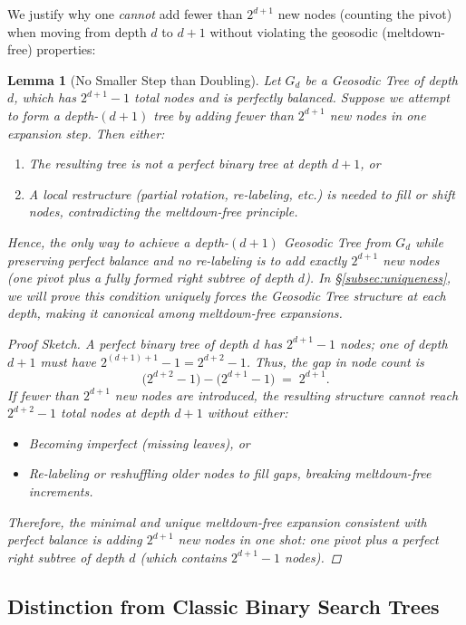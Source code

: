 \documentclass[11pt]{article}
\newtheorem{lemma}[theorem]{Lemma}
\theoremstyle{definition}
\theoremstyle{remark}
\begin{document}
We justify why one \emph{cannot} add fewer than $2^{d+1}$ new nodes (counting the pivot) 
when moving from depth $d$ to $d+1$ without violating the geosodic (meltdown-free) properties:

\begin{lemma}[No Smaller Step than Doubling]
\label{lem:no-smaller-step}
Let $G_d$ be a Geosodic Tree of depth $d$, which has $2^{d+1}-1$ total nodes 
and is perfectly balanced. Suppose we attempt to form a depth-$(d+1)$ tree by adding 
fewer than $2^{d+1}$ new nodes in one expansion step. Then either:
\begin{enumerate}
  \item The resulting tree is \emph{not} a perfect binary tree at depth $d+1$, or
  \item A local restructure (partial rotation, re-labeling, etc.) is needed to fill 
        or shift nodes, contradicting the meltdown-free principle.
\end{enumerate}
Hence, the only way to achieve a depth-$(d+1)$ Geosodic Tree from $G_d$ while preserving 
perfect balance and no re-labeling is to add exactly $2^{d+1}$ new nodes (one pivot plus a 
fully formed right subtree of depth $d$). In \S\ref{subsec:uniqueness},
we will prove this condition uniquely forces the Geosodic Tree structure
at each depth, making it \emph{canonical} among meltdown-free expansions.

\begin{proof}[Proof Sketch]
A perfect binary tree of depth $d$ has $2^{d+1}-1$ nodes; 
one of depth $d+1$ must have $2^{(d+1)+1}-1 = 2^{d+2}-1$. 
Thus, the gap in node count is 
\[
  \bigl(2^{d+2}-1\bigr) - \bigl(2^{d+1}-1\bigr) 
  \;=\;
  2^{d+1}.
\]
If fewer than $2^{d+1}$ new nodes are introduced, the resulting structure 
cannot reach $2^{d+2}-1$ total nodes at depth $d+1$ without either:
\begin{itemize}
  \item Becoming imperfect (missing leaves), or
  \item Re-labeling or reshuffling older nodes to fill gaps, breaking meltdown-free increments.
\end{itemize}
Therefore, the minimal and \emph{unique} meltdown-free expansion consistent with 
perfect balance is adding $2^{d+1}$ new nodes in one shot: 
one pivot plus a perfect right subtree of depth $d$ (which contains $2^{d+1}-1$ nodes).
\end{proof}
\end{lemma}

\subsection{Distinction from Classic Binary Search Trees}
\label{sec:distinction}
\end{document}
